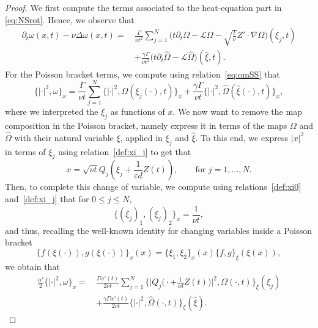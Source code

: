 \documentclass[11pt,reqno,a4paper]{amsart}
\def\eps{\varepsilon}
\def\de{{\partial}}
\newcommand{\cL}{\mathcal{L}}
\newcommand{\1}{\mathbbm{1}}
\theoremstyle{definition}
\theoremstyle{definition}
\numberwithin{equation}{section}
\begin{document}
\begin{proof}
We first compute the terms associated to the heat-equation part in \cref{eq:NSrot}. Hence, we observe that
\begin{align}
    \de_t\omega(x,t)-\nu\Delta\omega(x,t)=\, &\frac{\Gamma}{\nu t^2}\sum_{j=1}^N\big(t\de_t \Omega-\cL \Omega-\sqrt{\frac{t}{\nu}} Z'\cdot \nabla \Omega\big)(\xi_j,t)\\
    &+\frac{\gamma \Gamma}{\nu t^2}\big(t\de_t \widehat{\Omega}-\cL \widehat{\Omega}\big)(\widehat{\xi},t).
\end{align}
For the Poisson bracket terms, we compute using relation~\cref{eq:omSS} that
\begin{equation}
    \{|\cdot|^2,\omega\}_x = \frac{\Gamma}{\nu t} \sum_{j= 1}^N \{ |\cdot|^2,\Omega(\xi_j(\cdot),t)\}_x + \frac{\gamma\Gamma}{\nu t}\{ |\cdot|^2,\widehat{\Omega}(\widehat{\xi}(\cdot),t)\}_x,
\end{equation}
where we interpreted the $\xi_j$ as functions of $x$. We now want to remove the map composition in the Poisson bracket, namely express it in terms of the maps $\Omega$ and $\widehat{\Omega}$ with their natural variable $\xi$, applied in $\xi_j$ and $\widehat{\xi}$. To this end, we express $|x|^2$ in terms of $\xi_j$ using relation~\cref{def:xi_j} to get that
\begin{equation}\label{eq:x_in_xi_j}
    x=\sqrt{\nu t}Q_j( \xi_j+\frac{1}{\eps d}Z(t)), \qquad \text{for } j=1,\dots,N.
\end{equation}
Then, to complete this change of variable, we compute using relations~\cref{def:xi0} and~\cref{def:xi_j}  that for $0\le j \le N$,
\begin{equation}
    \{(\xi_j)_1,(\xi_j)_2\}_x=\frac{1}{\nu t},
\end{equation}
and thus, recalling the well-known identity for changing variables inside a Poisson bracket
\begin{equation}\label{eq:change_var_Poisson}
    \{ f(\xi(\cdot)),g(\xi(\cdot)) \}_x(x) = \{ \xi_1,\xi_2 \}_x(x) \{f,g\}_\xi(\xi(x)),
\end{equation}
we obtain that
\begin{align}
    \frac{\alpha'}{2}\{|\cdot|^2,\omega\}_x = \, & \frac{\Gamma\alpha'(t)}{2\nu t}\sum_{j=1}^N\big\{\big| Q_j\big(\cdot + \frac{1}{\eps d}Z(t)\big)\big|^2,\Omega(\cdot,t)\big\}_\xi(\xi_j)\\ 
&+\frac{\gamma\Gamma\alpha'(t)}{2\nu t}\big\{|\cdot|^2,\widehat{\Omega}(\cdot,t)\big\}_{\xi} (\widehat{\xi}).
\end{align}

\end{proof}
\end{document}
